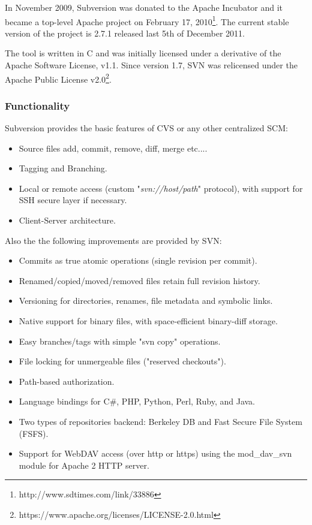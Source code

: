 \documentclass[a4paper,10pt]{article}
\begin{document}
In November 2009, Subversion was donated to the Apache Incubator and it became a
top-level Apache project on February 17,
2010\footnote{http://www.sdtimes.com/link/33886}. The current stable version of
the project is 2.7.1 released last 5th of December 2011.

The tool is written in C and was initially licensed under a derivative of the
Apache Software License, v1.1. Since version 1.7, SVN was relicensed under the
Apache Public License
v2.0\footnote{https://www.apache.org/licenses/LICENSE-2.0.html}.

\subsubsection{Functionality}

Subversion provides the basic features of CVS or any other centralized SCM:

\begin{itemize}
\item Source files add, commit, remove, diff, merge etc....
\item Tagging and Branching.
\item Local or remote access (custom "\textit{svn://host/path}" protocol), with
support for SSH secure layer if necessary.
\item Client-Server architecture.
\end{itemize}

Also the the following improvements are provided by SVN:

\begin{itemize}
\item Commits as true atomic operations (single revision per commit).
\item Renamed/copied/moved/removed files retain full revision history.
\item Versioning for directories, renames, file metadata and symbolic links.
\item Native support for binary files, with space-efficient binary-diff storage.
\item Easy branches/tags with simple "svn copy" operations.
\item File locking for unmergeable files ("reserved checkouts").
\item Path-based authorization.
\item Language bindings for C\#, PHP, Python, Perl, Ruby, and Java.
\item Two types of repositories backend: Berkeley DB and Fast Secure File System
(FSFS)\cite{FSFS}.
\item Support for WebDAV access (over http or https) using the mod\_dav\_svn
module for Apache 2 HTTP server.
\end{itemize}
\end{document}
